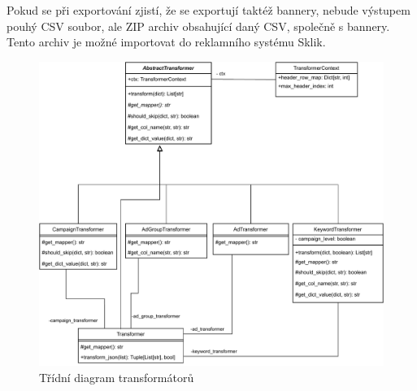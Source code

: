 Pokud se při exportování zjistí, že se exportují taktéž bannery, nebude výstupem pouhý CSV soubor, ale ZIP archiv obsahující daný CSV, společně s bannery.
Tento archiv je možné importovat do reklamního systému Sklik.

\begin{figure}[h]
    \centering
    \includegraphics[width=.8\textwidth]{Figures/Transformers.pdf}
    \caption{Třídní diagram transformátorů}
    \label{fig:transformers}
\end{figure}


\endinput